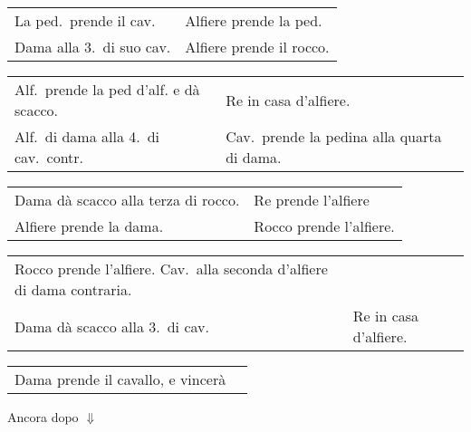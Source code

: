 \documentclass[11pt,a6paper]{article}
\newcommand{\markerA}{{\small$\Downarrow$}}
\begin{document}
{\small\noindent\begin{tabular}{@{}p{3.84cm}p{3.84cm}}
La ped.\ prende il cav. &Alfiere prende la ped.\\
Dama alla 3.\ di suo cav.& Alfiere prende il rocco.\\
\end{tabular}

\noindent\begin{tabular}{@{}p{3.84cm}p{3.84cm}}
Alf.\ prende la ped d'alf. e dà scacco.&Re in casa d'alfiere.\\
Alf.\ di dama alla 4.\ di cav.\ contr. & Cav.\ prende la pedina alla quarta di dama.\\
\end{tabular}

\noindent\begin{tabular}{@{}p{3.84cm}p{3.84cm}}
Dama dà scacco alla terza di rocco. & Re prende l'alfiere\\
Alfiere prende la dama. & Rocco prende l'alfiere.\\
\end{tabular}

\noindent\begin{tabular}{@{}p{3.84cm}p{3.84cm}}
Rocco prende l'alfiere. Cav.\ alla seconda d'alfiere di dama contraria. \\
Dama dà scacco alla 3.\ di cav. & Re in casa d'alfiere.\\
\end{tabular}

\noindent\begin{tabular}{@{}p{3.84cm}p{3.84cm}}
Dama prende il cavallo, e vincerà\\
\end{tabular}}

Ancora dopo \markerA
\end{document}
